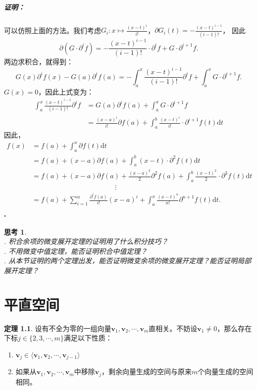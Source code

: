 \documentclass[12pt,UTF8]{ctexbook}
\theoremstyle{definition}
\newtheorem{tm}{定理}[section]
\theoremstyle{plain}
\newtheorem{sk}{思考}[section]
\renewenvironment{proof}{\paragraph{\textbf{证明：}}}{\hfill$\square$}
\begin{document}
\begin{appendix}
\begin{proof}
    可以仿照上面的方法。我们考虑$G_i: x\mapsto \frac{(x - t)^i}{i!}$，$\partial G_i(t) = -\frac{(x - t)^{i-1}}{(i-1)!}$，
    因此
    $$ \partial (G\cdot \partial^i f) = -\frac{(x - t)^{i-1}}{(i-1)!} \cdot \partial^i f + G \cdot \partial^{i+1} f. $$
    两边求积合，就得到：
    $$ G(x) \partial^i f(x) - G(a) \partial^i f(a) = - \int_a^x \frac{(x - t)^{i-1}}{(i-1)!} \partial^i f + \int_a^x G \cdot \partial^{i+1} f. $$
    $G(x) = 0$，因此上式变为：
    \begin{align*}
        \int_a^x \frac{(x - t)^{i-1}}{(i-1)!}\partial^i f & = G(a) \partial^i f(a)  + \int_a^x G \cdot \partial^{i+1} f \\
        & = \frac{(x - a)^i}{i!} \partial f(a) + \int_a^b \frac{(x - t)^i}{i!}\cdot \partial^{i+1} f(t)\mathrm{d}t
    \end{align*}
    因此，
    \begin{align*}
        f(x) &= f(a) + \int_a^x \partial f(t) \mathrm{d}t \\
        &= f(a) + (x - a) \partial f(a) + \int_a^b (x - t) \cdot \partial^2 f(t) \mathrm{d}t \\
        &= f(a) + (x - a) \partial f(a) + \frac{(x - a)^2}{2} \partial^2 f(a) + \int_a^b \frac{(x - t)^2}{2} \cdot \partial^3 f(t) \mathrm{d}t\\
        & \qquad \qquad \qquad \qquad\qquad \qquad \vdots \\
        &= f(a) + \sum_{i=1}^n \frac{\partial^i f(a)}{i!} (x - a)^i + \int_a^x \frac{(x - t)^{n}}{n!} \partial^{n+1} f(t)\mathrm{d}t. \\
    \end{align*}    
\end{proof}

\begin{sk}
    \mbox{} \\
    . 积合余项的微变展开定理的证明用了什么积分技巧？\\
    . 不用微变中值定理，能否证明积合中值定理？\\
    . 从本节证明的两个定理出发，能否证明微变余项的微变展开定理？能否证明局部展开定理？
\end{sk}

\chapter{平直空间}

\begin{tm}\label{tm:d-1-20}
    设有不全为零的一组向量$\mathbf{v}_1, \mathbf{v}_2 , \cdots , \mathbf{v}_m$直相关。不妨设$\mathbf{v}_1 \neq 0$，那么存在下标$j \in \{2,3, \cdots, m\}$满足以下性质：
    \begin{enumerate}
    \item $\mathbf{v}_j \in \langle \mathbf{v}_1, \mathbf{v}_2 , \cdots , \mathbf{v}_{j-1}\rangle$
    \item 如果从$\mathbf{v}_1, \mathbf{v}_2 , \cdots , \mathbf{v}_m$中移除$\mathbf{v}_j$，剩余向量生成的空间与原来$m$个向量生成的空间相同。
    \end{enumerate}
\end{tm}


\end{appendix}
\end{document}
